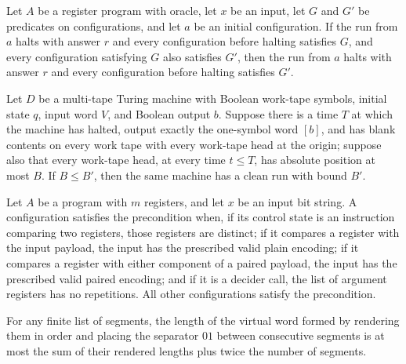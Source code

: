\begin{lemma}
\label{Complexity.LogProg.AHalt.mono}
\leanok
{}
Let $A$ be a register program with oracle, let $x$ be an input, let $G$ and $G'$ be
predicates on configurations, and let $a$ be an initial configuration. If the run from
$a$ halts with answer $r$ and every configuration before halting satisfies $G$, and
every configuration satisfying $G$ also satisfies $G'$, then the run from $a$ halts with
answer $r$ and every configuration before halting satisfies $G'.$
\end{lemma}

\begin{lemma}
\label{Complexity.LogProg.cleanRun_mono}
\leanok
{}
Let $D$ be a multi-tape Turing machine with Boolean work-tape symbols, initial state
$q$, input word $V$, and Boolean output $b$. Suppose there is a time $T$ at which the
machine has halted, output exactly the one-symbol word $[b]$, and has blank contents on
every work tape with every work-tape head at the origin; suppose also that every
work-tape head, at every time $t\le T$, has absolute position at most $B$. If $B\le B'$,
then the same machine has a clean run with bound $B'$.
\end{lemma}

\begin{definition}
\label{Complexity.LogProg.PreS}
\leanok
{}
Let $A$ be a program with $m$ registers, and let $x$ be an input bit string. A
configuration satisfies the precondition when, if its control state is an instruction
comparing two registers, those registers are distinct; if it compares a register with
the input payload, the input has the prescribed valid plain encoding; if it compares a
register with either component of a paired payload, the input has the prescribed valid
paired encoding; and if it is a decider call, the list of argument registers has no
repetitions. All other configurations satisfy the precondition.
\end{definition}

\begin{lemma}
\label{Complexity.LogProg.length_vword_le}
\leanok
{}
For any finite list of segments, the length of the virtual word formed by rendering them
in order and placing the separator $01$ between consecutive segments is at most the sum
of their rendered lengths plus twice the number of segments.
\end{lemma}

